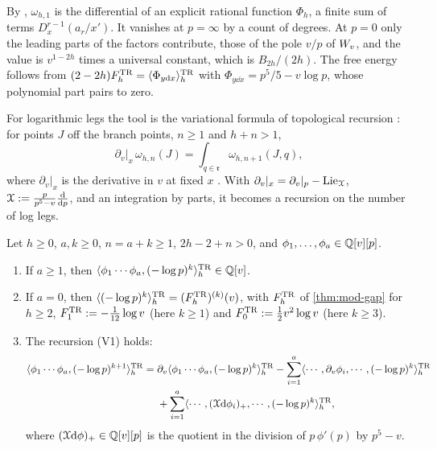 \begin{sketch}
By \cite[(7.10)]{ABDKS25}, $\omega_{h,1}$ is the differential of an explicit rational function $\Phi_h$, a finite sum of terms $D_x^{r-1}(a_r/x')$. It vanishes at $p=\infty$ by a count of degrees. At $p=0$ only the leading parts of the factors contribute, those of the pole $v/p$ of $W_{v}$, and the value is $v^{1-2h}$ times a universal constant, which is $B_{2h}/(2h)$. The free energy follows from $(2-2h)F^{\mathrm{TR}}_h=\langle\Phi_{y\mathrm{d} x}\rangle^{\mathrm{TR}}_h$ with $\Phi_{y\dd x}=p^5/5-v\log p$, whose polynomial part pairs to zero.
\end{sketch}

For logarithmic legs the tool is the variational formula of topological recursion \cite[Theorem~5.1, (5-14)]{Eynard:2007kz}: for points $J$ off the branch points, $n\geq1$ and $h+n>1$,
\[
\partial_v|_x\,\omega_{h,n}(J)=\int_{q\in\mathfrak r}\omega_{h,n+1}(J,q),
\]
where $\partial_v|_x$ is the derivative in $v$ at fixed $x$ . With $\partial_v|_x=\partial_v|_p-\mathrm{Lie}_{\mathcal{X}}$, $\mathcal{X}:=\frac p{p^5-v}\frac{\mathrm{d}}{\mathrm{d} p}$, and an integration by parts, it becomes a recursion on the number of log legs.

\begin{thm}
\label{thm:mod-V}
Let $h\geq0$, $a,k\geq0$, $n=a+k\geq1$, $2h-2+n>0$, and $\phi_1,\dots,\phi_a\in\mathbb{Q}[v][p]$.
\begin{enumerate}
\item If $a\geq1$, then $\langle\phi_1\cdots\phi_a,(-\log p)^k\rangle^{\mathrm{TR}}_h\in\mathbb{Q}[v]$.
\item If $a=0$, then $\langle(-\log p)^k\rangle^{\mathrm{TR}}_h=(F^{\mathrm{TR}}_h)^{(k)}(v)$, with $F^{\mathrm{TR}}_h$ of \cref{thm:mod-gap} for $h\geq2$, $F^{\mathrm{TR}}_1:=-\frac1{12}\log v$ (here $k\geq1$) and $F^{\mathrm{TR}}_0:=\frac12v^2\log v$ (here $k\geq3$).
\item The recursion (V1) holds:
\[
\begin{aligned}
\langle\phi_1\cdots\phi_a,(-\log p)^{k+1}\rangle^{\mathrm{TR}}_h={}&\partial_v\langle\phi_1\cdots\phi_a,(-\log p)^k\rangle^{\mathrm{TR}}_h-\sum_{i=1}^a\langle\cdots,\partial_v\phi_i,\cdots,(-\log p)^k\rangle^{\mathrm{TR}}_h\\
&+\sum_{i=1}^a\langle\cdots,(\mathcal{X}\mathrm{d}\phi_i)_+,\cdots,(-\log p)^k\rangle^{\mathrm{TR}}_h ,
\end{aligned}
\]
where $(\mathcal{X}\mathrm{d}\phi)_+\in\mathbb{Q}[v][p]$ is the quotient in the division of $p\,\phi'(p)$ by $p^5-v$.
\end{enumerate}
\end{thm}

